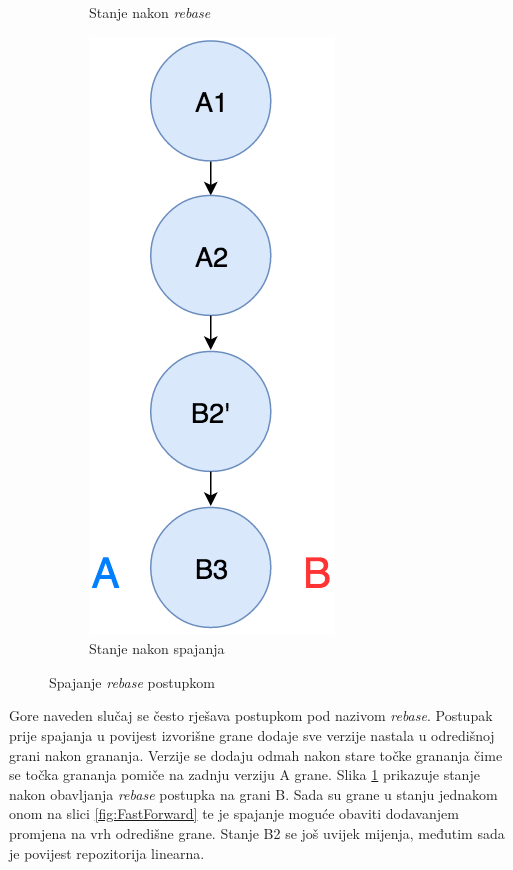 \documentclass[times, utf8, diplomski, numeric]{fer}
\begin{document}
\begin{figure}[h!]
\begin{subfigure}{.3\textwidth}
        \caption{Stanje nakon \textit{rebase}}
        \label{fig:RebaseB}
    \end{subfigure}
        \begin{subfigure}{.3\textwidth}
        \centering
        \includegraphics[scale=0.5]{RebaseC}
        \caption{Stanje nakon spajanja}
        \label{fig:RebaseC}
    \end{subfigure}
    \caption{Spajanje \textit{rebase} postupkom}
    \label{fig:Rebase}
\end{figure}

Gore naveden slučaj se često rješava postupkom pod nazivom \textit{rebase}. Postupak prije spajanja u povijest izvorišne grane dodaje sve verzije nastala u odredišnoj grani nakon grananja. Verzije se dodaju odmah nakon stare točke grananja čime se točka grananja pomiče na zadnju verziju A grane. Slika \ref{fig:RebaseB} prikazuje stanje nakon obavljanja \textit{rebase} postupka na grani B. Sada su grane u stanju jednakom onom na slici \ref{fig:FastForward} te je spajanje moguće obaviti dodavanjem promjena na vrh odredišne grane. Stanje B2 se još uvijek mijenja, međutim sada je povijest repozitorija linearna.
\end{document}
